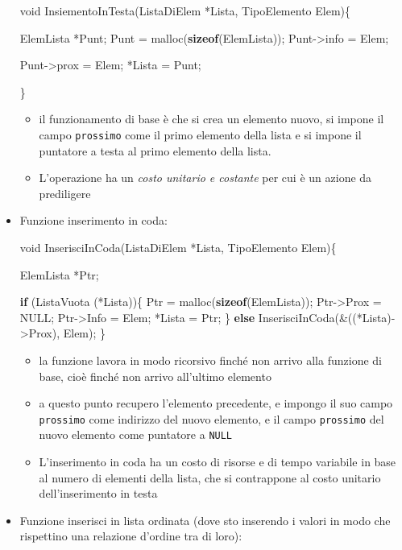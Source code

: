 \documentclass[
]{article}
\newenvironment{Shaded}{}{}
\newcommand{\ControlFlowTok}[1]{\textcolor[rgb]{0.00,0.44,0.13}{\textbf{#1}}}
\newcommand{\DataTypeTok}[1]{\textcolor[rgb]{0.56,0.13,0.00}{#1}}
\newcommand{\KeywordTok}[1]{\textcolor[rgb]{0.00,0.44,0.13}{\textbf{#1}}}
\newcommand{\NormalTok}[1]{#1}
\begin{document}
\begin{itemize}
\begin{Shaded}
\begin{Highlighting}[]
\DataTypeTok{void}\NormalTok{ InsiementoInTesta(ListaDiElem *Lista, TipoElemento Elem)\{}

\NormalTok{    ElemLista *Punt;}
\NormalTok{    Punt = malloc(}\KeywordTok{sizeof}\NormalTok{(ElemLista));}
\NormalTok{    Punt{-}\textgreater{}info = Elem;}
    
\NormalTok{    Punt{-}\textgreater{}prox = Elem;}
\NormalTok{    *Lista = Punt;}
	
\NormalTok{\}}
\end{Highlighting}
\end{Shaded}

  \begin{itemize}
  \item
    il funzionamento di base è che si crea un elemento nuovo, si impone
    il campo \texttt{prossimo} come il primo elemento della lista e si
    impone il puntatore a testa al primo elemento della lista.
  \item
    L'operazione ha un \emph{costo unitario e costante} per cui è un
    azione da prediligere
  \end{itemize}
\item
  Funzione inserimento in coda:

\begin{Shaded}
\begin{Highlighting}[]
\DataTypeTok{void}\NormalTok{ InserisciInCoda(ListaDiElem *Lista, TipoElemento Elem)\{}
   
\NormalTok{    ElemLista *Ptr;}
    
    \ControlFlowTok{if}\NormalTok{ (ListaVuota (*Lista))\{}
\NormalTok{        Ptr = malloc(}\KeywordTok{sizeof}\NormalTok{(ElemLista));}
\NormalTok{        Ptr{-}\textgreater{}Prox = NULL;}
\NormalTok{        Ptr{-}\textgreater{}Info = Elem;}
\NormalTok{        *Lista = Ptr;}
\NormalTok{    \}}
    \ControlFlowTok{else}\NormalTok{ InserisciInCoda(\&((*Lista){-}\textgreater{}Prox), Elem);}
\NormalTok{\}}
\end{Highlighting}
\end{Shaded}

  \begin{itemize}
  \item
    la funzione lavora in modo ricorsivo finché non arrivo alla funzione
    di base, cioè finché non arrivo all'ultimo elemento
  \item
    a questo punto recupero l'elemento precedente, e impongo il suo
    campo \texttt{prossimo} come indirizzo del nuovo elemento, e il
    campo \texttt{prossimo} del nuovo elemento come puntatore a
    \texttt{NULL}
  \item
    L'inserimento in coda ha un costo di risorse e di tempo variabile in
    base al numero di elementi della lista, che si contrappone al costo
    unitario dell'inserimento in testa
  \end{itemize}
\item
  Funzione inserisci in lista ordinata (dove sto inserendo i valori in
  modo che rispettino una relazione d'ordine tra di loro):


\end{itemize}
\end{document}
